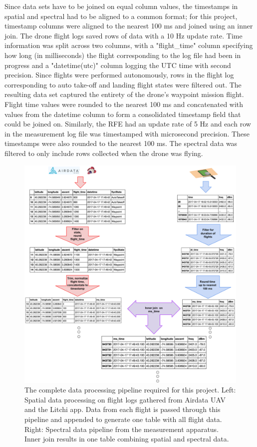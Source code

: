 \documentclass[pageno]{jpaper}
\begin{document}
Since data sets have to be joined on equal column values, the timestamps in spatial and spectral had to be aligned to a common format; for this project, timestamp columns were aligned to the nearest 100 ms and joined using an inner join. The drone flight logs saved rows of data with a 10 Hz update rate. Time information was split across two columns, with a "flight\_time" column specifying how long (in milliseconds) the flight corresponding to the log file had been in progress and a "datetime(utc)" column logging the UTC time with second precision. Since flights were performed autonomously, rows in the flight log corresponding to auto take-off and landing flight states were filtered out. The resulting data set captured the entirety of the drone's waypoint mission flight. Flight time values were rounded to the nearest 100 ms and concatenated with values from the datetime column to form a consolidated timestamp field that could be joined on. Similarly, the RFE had an update rate of 5 Hz and each row in the measurement log file was timestamped with microsecond precision. These timestamps were also rounded to the nearest 100 ms. 
The spectral data was filtered to only include rows collected when the drone was flying.

\begin{figure}[!ht]
	\caption[Data processing pipeline]{The complete data processing pipeline required for this project. Left: Spatial data processing on flight logs gathered from Airdata UAV and the Litchi app. Data from each flight is passed through this pipeline and appended to generate one table with all flight data. Right: Spectral data pipeline from the measurement apparatus. Inner join results in one table combining spatial and spectral data.}
	\centerline{\includegraphics{data_pipeline}}
\end{figure}
\pagebreak
\end{document}
